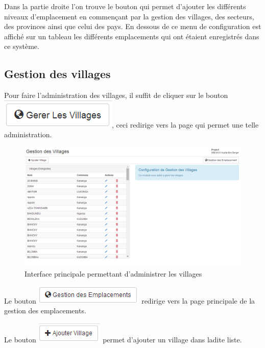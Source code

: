 \documentclass[12pt,a4paper]{report}
\begin{document}
Dans la partie droite l'on trouve le bouton qui permet d'ajouter les différents niveaux d'emplacement en commençant par la gestion des villages, des secteurs, des provinces ainsi que celui des pays. En dessous de ce menu de configuration est affiché sur un tableau les différents emplacements qui ont étaient enregistrés dans ce système. 
\newpage
\subsection{Gestion des villages}
Pour faire l'administration des villages, il suffit de cliquer sur le bouton\\ \includegraphics[scale=0.7]{pic/GererVillage.png}, ceci redirige vers la page qui permet une telle administration.

\begin{figure}[h]
\begin{center}
\includegraphics[width=14cm]{pic/AdminVillage.png}
\end{center}
\caption{Interface principale permettant d'administrer les villages}
\label{Interface principale permettant d'administrer les villages}
\end{figure}

Le bouton \includegraphics[scale=0.7]{pic/GestionEmplacement.png} redirige vers la page principale de la gestion des emplacements.

Le bouton \includegraphics[scale=0.7]{pic/AddVillage.png} permet d'ajouter un village dans ladite liste.
\end{document}
